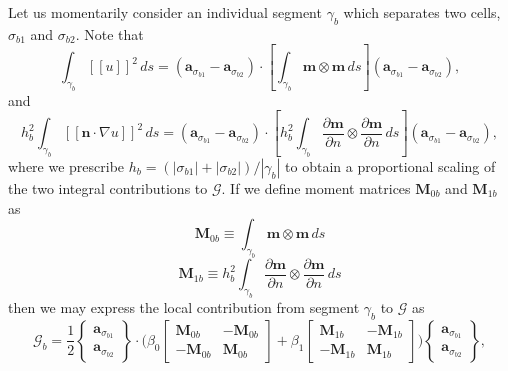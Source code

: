 Let us momentarily consider an individual segment $\gamma_b$ which separates two cells, $\sigma_{b1}$ and $\sigma_{b2}$. Note that
\begin{equation}
        \int_{\gamma_b} [\![ u ]\!]^2 \, ds = (\mathbf{a}_{\sigma_{b1}} - \mathbf{a}_{\sigma_{b2}}) \cdot \left[ \int_{\gamma_b} \mathbf{m} \otimes \mathbf{m} \, ds \right] (\mathbf{a}_{\sigma_{b1}} - \mathbf{a}_{\sigma_{b2}}),
\end{equation}
and
\begin{equation}
        h_b^2 \int_{\gamma_b} [\![ \mathbf{n} \cdot \nabla u ]\!]^2 \, ds = (\mathbf{a}_{\sigma_{b1}} - \mathbf{a}_{\sigma_{b2}}) \cdot \left[ h_b^2 \int_{\gamma_b} \frac{\partial \mathbf{m}}{\partial n} \otimes \frac{\partial \mathbf{m}}{\partial n} \, ds \right] (\mathbf{a}_{\sigma_{b1}} - \mathbf{a}_{\sigma_{b2}}),
\end{equation}
where we prescribe $h_b = (|\sigma_{b1}| + |\sigma_{b2}|)/|\gamma_{b}|$ to obtain a proportional scaling of the two integral contributions to $\mathcal{G}$. If we define moment matrices $\mathbf{M}_{0b}$ and $\mathbf{M}_{1b}$ as
\begin{equation}
        \mathbf{M}_{0b} \equiv \int_{\gamma_b} \mathbf{m} \otimes \mathbf{m} \, ds
\end{equation}
\begin{equation}
        \mathbf{M}_{1b} \equiv h_b^2 \int_{\gamma_b} \frac{\partial \mathbf{m}}{\partial n} \otimes \frac{\partial \mathbf{m}}{\partial n} \, ds
\end{equation}
then we may express the local contribution from segment $\gamma_b$ to $\mathcal{G}$ as
\begin{equation}
        \mathcal{G}_b = \frac{1}{2} \left\{ \begin{array}{c} \mathbf{a}_{\sigma_{b1}} \\ \mathbf{a}_{\sigma_{b2}} \end{array} \right\} \cdot \bigg( \beta_0 \left[ \begin{array}{cc} \mathbf{M}_{0b} & - \mathbf{M}_{0b} \\ - \mathbf{M}_{0b} & \mathbf{M}_{0b} \end{array} \right] + \beta_1 \left[ \begin{array}{cc} \mathbf{M}_{1b} & - \mathbf{M}_{1b} \\ - \mathbf{M}_{1b} & \mathbf{M}_{1b} \end{array} \right] \bigg) \left\{ \begin{array}{c} \mathbf{a}_{\sigma_{b1}} \\ \mathbf{a}_{\sigma_{b2}} \end{array} \right\},
\end{equation}
